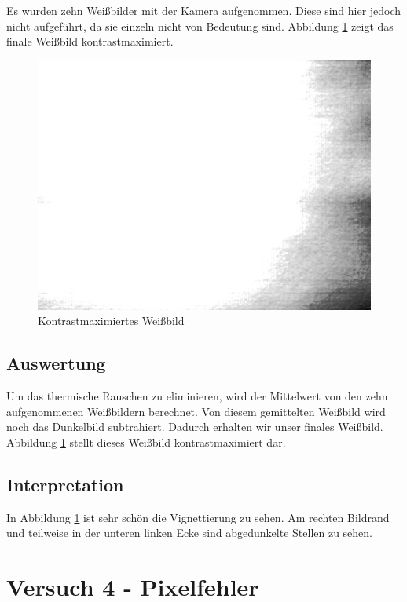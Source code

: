 \documentclass[12pt,oneside,a4paper]{report}
\begin{document}
Es wurden zehn Weißbilder mit der Kamera aufgenommen. Diese sind hier jedoch nicht aufgeführt, da sie einzeln nicht von Bedeutung sind.
Abbildung \ref{fig:WEISSBILD} zeigt das finale Weißbild kontrastmaximiert.
 
\begin{figure}
\centering\small
\includegraphics[scale=0.6]{src/WeissbildContrastMax.png}
\caption{Kontrastmaximiertes Weißbild}
\label{fig:WEISSBILD}
\end{figure}

\section{Auswertung}
\label{chap:VERSUCH_3_AUSWERTUNG}

Um das thermische Rauschen zu eliminieren, wird der Mittelwert von den zehn aufgenommenen Weißbildern berechnet. Von diesem gemittelten Weißbild wird noch das Dunkelbild subtrahiert.
Dadurch erhalten wir unser finales Weißbild. Abbildung \ref{fig:WEISSBILD} stellt dieses Weißbild kontrastmaximiert dar.

\section{Interpretation}
\label{chap:VERSUCH_3_INTERPRETATION}

In Abbildung \ref{fig:WEISSBILD} ist sehr schön die Vignettierung zu sehen. Am rechten Bildrand und teilweise in der unteren linken Ecke sind abgedunkelte Stellen zu sehen.
%
%
\chapter{Versuch 4 - Pixelfehler}
\label{chap:VERSUCH_4}
\end{document}
